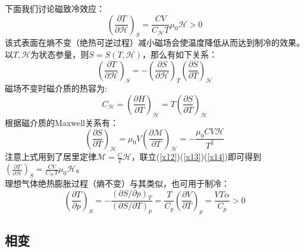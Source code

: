 \documentclass[12pt]{article}
\begin{document}
下面我们讨论磁致冷效应：
\begin{equation}
	(\frac{\partial T}{\partial \mathscr{H}})_S=\frac{CV}{C_{\mathscr{H}}T}\mu_0\mathscr{H} >0
\end{equation}
该式表面在熵不变（绝热可逆过程）减小磁场会使温度降低从而达到制冷的效果。\\
以$T,\mathscr{H}$为状态参量，则$S=S(T,\mathscr{H})$，那么有如下关系：
\begin{equation}
	(\frac{\partial T}{\partial \mathscr{H}})_S=-(\frac{\partial S}{\partial \mathscr{H}})_T(\frac{\partial S}{\partial T})_\mathscr{H}
	\label{x12}
\end{equation}
磁场不变时磁介质的热容为:
\begin{equation}
	C_\mathscr{H}=(\frac{\partial H}{\partial T})_\mathscr{H}=T(\frac{\partial S}{\partial T})_\mathscr{H}
	\label{x13}
\end{equation}
根据磁介质的Maxwell关系有：
\begin{equation}
	(\frac{\partial S}{\partial T})_\mathscr{H}=\mu_0 V(\frac{\partial\mathscr{M}}{\partial T})_\mathscr{H}=-\frac{\mu_0CV\mathscr{H}}{T^2}
	\label{x14}
\end{equation}	
注意上式用到了居里定律$\mathscr{M}=\frac{C}{T}\mathscr{H}$，联立(\ref{x12})(\ref{x13})(\ref{x14})即可得到$	(\frac{\partial T}{\partial \mathscr{H}})_S=\frac{CV}{C_{\mathscr{H}}T}\mu_0\mathscr{H}$。\\
理想气体绝热膨胀过程（熵不变）与其类似，也可用于制冷：
\begin{equation}
	(\frac{\partial T}{\partial p})_S=-\frac{(\partial S/\partial p)_T}{(\partial S/\partial T)_p}=\frac{T}{C_p}(\frac{\partial V}{\partial T})_p=\frac{VT\alpha}{C_p}>0
\end{equation}
\newpage
\subsection{相变}
\end{document}
